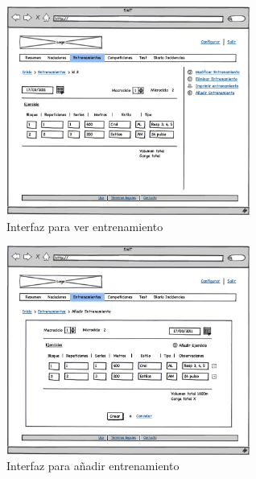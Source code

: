 	\begin{figure}[H]
	  \centering
	    \includegraphics[width=8cm]{./eps/20_Entrenamientos_show.eps}
	  \caption{Interfaz para ver entrenamiento}
	  \label{fig:interfaz_competiciones_show}
	\end{figure}
	
	
	
	\begin{figure}[H]
	  \centering
	    \includegraphics[width=8cm]{./eps/19_Entrenamientos_new.eps}
	  \caption{Interfaz para añadir entrenamiento}
	  \label{fig:interfaz_entrenamientos_new}
	\end{figure}


